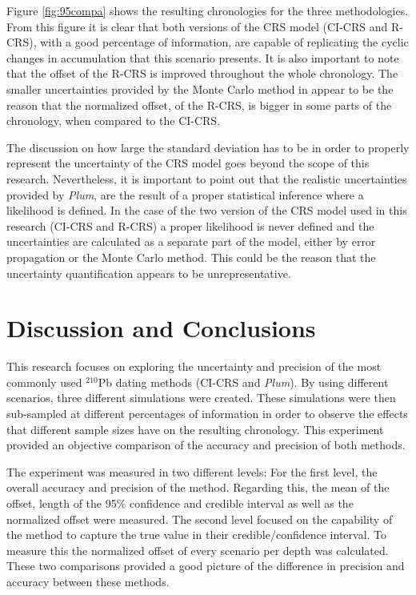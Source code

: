 \documentclass [10pt] {article}
\begin{document}
Figure \ref{fig:95compa} shows the resulting chronologies for the three methodologies.
From this figure it is clear that both versions of the CRS model (CI-CRS and R-CRS), with a good percentage of information, are capable of replicating the cyclic changes in accumulation that this scenario presents.
It is also important to note that the offset of the R-CRS is improved throughout the whole chronology. 
The smaller uncertainties provided by the Monte Carlo method in \citet{Sanchez-Cabeza2014} appear to be the reason that the normalized offset, of the R-CRS, is bigger in some parts of the chronology, when compared to the CI-CRS. 

The discussion on how large the standard deviation has to be in order to properly represent the uncertainty of the CRS model goes beyond the scope of this research.
Nevertheless, it is important to point out that the realistic uncertainties provided by \textit{Plum}, are the result of a proper statistical inference where a likelihood is defined.
In the case of the two version of the CRS model used in this research (CI-CRS and R-CRS) a proper likelihood is never defined and the uncertainties are calculated as a separate part of the model, either by error propagation or the Monte Carlo method.
This could be the reason that the uncertainty quantification appears to be unrepresentative.






\section{Discussion and Conclusions}

This research focuses on exploring the uncertainty and precision of the most commonly used $^{210}$Pb dating methods (CI-CRS and \textit{Plum}).
By using different scenarios, three different simulations were created.
These simulations were then sub-sampled at different percentages of information in order to observe the effects that different sample sizes have on the resulting chronology. 
This experiment provided an objective comparison of the accuracy and precision of both methods.

The experiment was measured in two different levels: For the first level, the overall accuracy and precision of the method.
Regarding this, the mean of the offset, length of the 95\% confidence and credible interval as well as the normalized offset were measured.
The second level focused on the capability of the method to capture the true value in their credible/confidence interval.
To measure this the normalized offset of every scenario per depth was calculated. 
These two comparisons provided a good picture of the difference in precision and accuracy between these methods.
\end{document}
